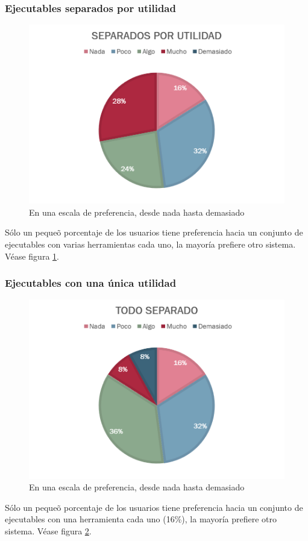 \documentclass[]{article}
\begin{document}
\subsubsection{Ejecutables separados por utilidad}
\begin{figure}[H]
	
	\centering
	\includegraphics[width=1\textwidth]{Encuesta_facilidad_separados}
	\caption{En una escala de preferencia, desde nada hasta demasiado} 
	\label{SEPARATED}
	
\end{figure}
S\'olo un peque\~o porcentaje de los usuarios tiene preferencia hacia un conjunto de ejecutables con varias herramientas cada uno, la mayor\'ia prefiere otro sistema. V\'ease figura \ref{SEPARATED}.
\subsubsection{Ejecutables con una \'unica utilidad}
\begin{figure}[H]
	
	\centering
	\includegraphics[width=1\textwidth]{Encuesta_facilidad_todoseparado}
	\caption{En una escala de preferencia, desde nada hasta demasiado} 
	\label{DICED}
	
\end{figure}
S\'olo un peque\~o porcentaje de los usuarios tiene preferencia hacia un conjunto de ejecutables con una herramienta cada uno (16\%), la mayor\'ia prefiere otro sistema. V\'ease figura \ref{DICED}.
\end{document}
